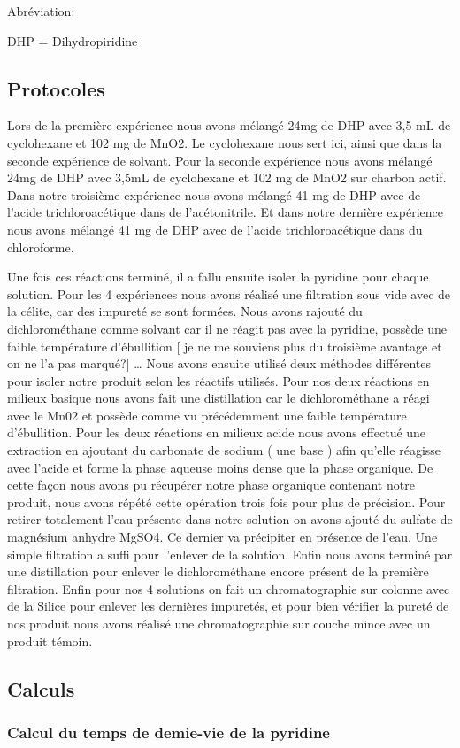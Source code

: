 \documentclass{article}
\begin{document}
\medbreak
Abréviation: 

DHP = Dihydropiridine




\medbreak

\subsection{Protocoles}

Lors de la première expérience nous avons mélangé 24mg de DHP avec 3,5 mL de cyclohexane et 102 mg de MnO2. Le cyclohexane nous sert ici, ainsi que dans la seconde expérience de solvant.
Pour la seconde expérience nous avons mélangé 24mg de DHP avec 3,5mL de cyclohexane et 102 mg de MnO2 sur charbon actif. 
Dans notre troisième expérience nous avons mélangé 41 mg de DHP avec de l’acide trichloroacétique dans de l’acétonitrile.
Et dans notre dernière expérience nous avons mélangé 41 mg de DHP avec de l’acide trichloroacétique dans du chloroforme.
\medbreak

Une fois ces réactions terminé, il a fallu ensuite isoler la pyridine pour chaque solution. 
\medbreak
Pour les 4 expériences nous avons réalisé une filtration sous vide avec de la célite, car  des impureté se sont formées. Nous avons rajouté du dichlorométhane comme solvant car il ne  réagit pas avec la pyridine, possède une faible température d’ébullition [ je ne me souviens plus du troisième avantage et on ne l’a pas marqué?] …
\medbreak
Nous avons ensuite utilisé deux méthodes différentes pour isoler notre produit selon les réactifs utilisés.
Pour nos deux réactions en milieux basique nous avons fait une distillation car le dichlorométhane a réagi  avec le Mn02 et possède comme vu précédemment une faible température d’ébullition.
Pour les deux réactions en milieux acide nous avons effectué une extraction en ajoutant du carbonate de sodium ( une base ) afin qu’elle réagisse avec l’acide et forme la phase aqueuse  moins dense que la phase organique. De cette façon nous avons pu récupérer notre phase organique contenant notre produit, nous avons répété cette opération trois fois pour plus de précision. Pour retirer totalement l’eau présente dans notre solution on avons ajouté du sulfate de magnésium anhydre MgSO4. Ce dernier va précipiter en présence de l’eau. Une simple filtration a suffi pour l’enlever de la solution.  Enfin nous avons terminé par une distillation pour enlever le dichlorométhane encore présent de la première filtration.
Enfin pour nos 4 solutions on fait un chromatographie sur colonne avec de la Silice pour enlever les dernières impuretés, et  pour bien vérifier la pureté de nos produit nous avons réalisé une chromatographie sur couche mince avec un produit témoin.




\medbreak

\subsection{Calculs}

\subsubsection*{Calcul du temps de demie-vie de la pyridine}
\end{document}
